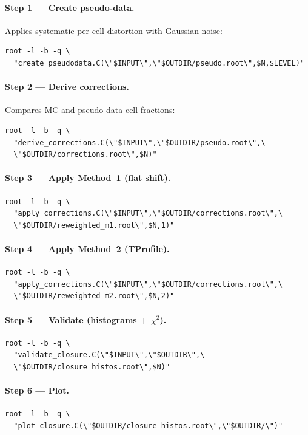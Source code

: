\documentclass[12pt,a4paper]{article}
\begin{document}
\paragraph{Step 1 — Create pseudo-data.}
Applies systematic per-cell distortion with Gaussian noise:
\begin{lstlisting}
root -l -b -q \
  "create_pseudodata.C(\"$INPUT\",\"$OUTDIR/pseudo.root\",$N,$LEVEL)"
\end{lstlisting}

\paragraph{Step 2 — Derive corrections.}
Compares MC and pseudo-data cell fractions:
\begin{lstlisting}
root -l -b -q \
  "derive_corrections.C(\"$INPUT\",\"$OUTDIR/pseudo.root\",\
  \"$OUTDIR/corrections.root\",$N)"
\end{lstlisting}

\paragraph{Step 3 — Apply Method~1 (flat shift).}
\begin{lstlisting}
root -l -b -q \
  "apply_corrections.C(\"$INPUT\",\"$OUTDIR/corrections.root\",\
  \"$OUTDIR/reweighted_m1.root\",$N,1)"
\end{lstlisting}

\paragraph{Step 4 — Apply Method~2 (TProfile).}
\begin{lstlisting}
root -l -b -q \
  "apply_corrections.C(\"$INPUT\",\"$OUTDIR/corrections.root\",\
  \"$OUTDIR/reweighted_m2.root\",$N,2)"
\end{lstlisting}

\paragraph{Step 5 — Validate (histograms + $\chi^2$).}
\begin{lstlisting}
root -l -b -q \
  "validate_closure.C(\"$INPUT\",\"$OUTDIR\",\
  \"$OUTDIR/closure_histos.root\",$N)"
\end{lstlisting}

\paragraph{Step 6 — Plot.}
\begin{lstlisting}
root -l -b -q \
  "plot_closure.C(\"$OUTDIR/closure_histos.root\",\"$OUTDIR/\")"
\end{lstlisting}
\end{document}
